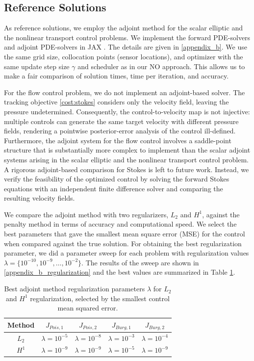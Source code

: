 \documentclass[final,1p,times]{elsarticle}
\theoremstyle{plain} %
\theoremstyle{definition} %
\theoremstyle{remark} %
\begin{document}
\subsection{Reference Solutions}
As reference solutions, we employ the adjoint method for the scalar elliptic and the nonlinear transport control problems. We implement the forward PDE-solvers and adjoint PDE-solvers in JAX \cite{jax2018github}. The details are given in \ref{appendix_b}. We use the same grid size, collocation points (sensor locations), and optimizer with the same update step size $\gamma$ and scheduler as in our NO approach. This allows us to make a fair comparison of solution times, time per iteration, and accuracy. 

For the flow control problem, we do not implement an adjoint-based solver. The tracking objective \eqref{cost:stokes} considers only the velocity field, leaving the pressure undetermined. Consequently, the control-to-velocity map is not injective: multiple controls can generate the same target velocity with different pressure fields, rendering a pointwise posterior-error analysis of the control ill-defined. Furthermore, the adjoint system for the flow control involves a saddle-point structure that is substantially more complex to implement than the scalar adjoint systems arising in the scalar elliptic and the nonlinear transport control problem. A rigorous adjoint-based comparison for Stokes is left to future work. Instead, we verify the feasibility of the optimized control by solving the forward Stokes equations with an independent finite difference solver and comparing the resulting velocity fields.

We compare the adjoint method with two regularizers, $L_2$ and $H^1$, against the penalty method in terms of accuracy and computational speed. We select the best parameters that gave the smallest mean square error (MSE) for the control when compared against the true solution. For obtaining the best regularization parameter, we did a parameter sweep for each problem with regularization values $\lambda=\{10^{-10},10^{-9},\dots,10^{-2}\}$. The results of the sweep are shown in \ref{appendix_b_regularization} and the best values are summarized in Table \ref{tab:ref_best_lambda_summary}.

\begin{table}[!h]
\centering
\caption{Best adjoint method regularization parameters $\lambda$ for $L_2$ and $H^1$ regularization, selected by the smallest control mean squared error.}
\label{tab:ref_best_lambda_summary}
\renewcommand{\arraystretch}{1.15}
\setlength{\tabcolsep}{5pt}

\begin{tabular}{c cccc}
\toprule
Method & $J_{Pois,1}$ & $J_{Pois,2}$ & $J_{Burg,1}$ & $J_{Burg,2}$ \\
\midrule
$L_2$ & $\lambda=10^{-5}$ & $\lambda=10^{-8}$ & $\lambda=10^{-3}$ & $\lambda=10^{-4}$ \\
$H^1$ & $\lambda=10^{-9}$ & $\lambda=10^{-9}$ & $\lambda=10^{-5}$ & $\lambda=10^{-9}$ \\
\bottomrule
\end{tabular}
\end{table}
\end{document}
